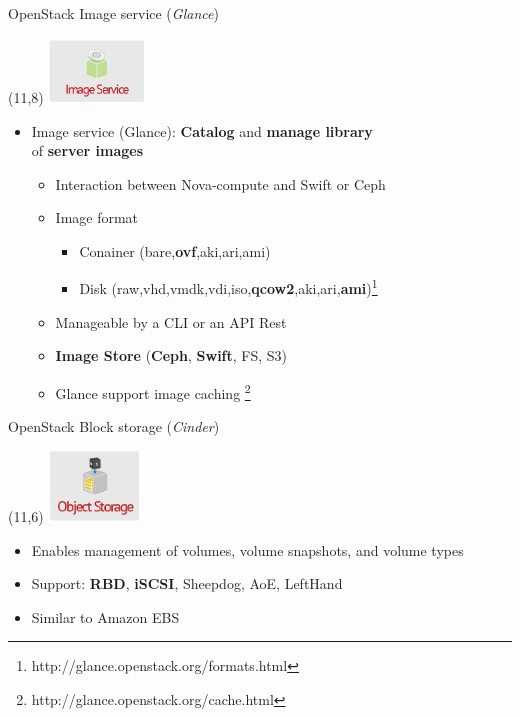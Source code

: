 \begin{frame}{OpenStack Image service (\textsl{Glance})}
  \begin{textblock}{}(11,8)
    \includegraphics[width=7em]{img/image}
  \end{textblock}
  \begin{itemize}
    \item Image service (Glance): \textbf{Catalog} and \textbf{manage library}\\
      of \textbf{server images}
      \medskip
    \begin{itemize}
      \item Interaction between Nova-compute and Swift or Ceph
        \medskip
        \item Image format
        \begin{itemize}
          \item Conainer (bare,\textbf{ovf},aki,ari,ami)
          \item Disk (raw,vhd,vmdk,vdi,iso,\textbf{qcow2},aki,ari,\textbf{ami})\footnote{http://glance.openstack.org/formats.html}
        \end{itemize}
        \medskip
      \item Manageable by a CLI or an API Rest
        \medskip
      \item \textbf{Image Store} (\textbf{Ceph}, \textbf{Swift}, FS, S3)
        \medskip
      \item Glance support image caching \footnote{http://glance.openstack.org/cache.html}
    \end{itemize}
  \end{itemize}
\end{frame}

\begin{frame}{OpenStack Block storage (\textsl{Cinder})}
  \begin{textblock}{}(11,6)
    \includegraphics[width=6.5em]{img/swift}
  \end{textblock}
  \begin{itemize}
    \item Enables management of volumes, volume snapshots, and volume types
        \medskip
    \item Support: \textbf{RBD}, \textbf{iSCSI}, Sheepdog, AoE, LeftHand
        \medskip
    \item Similar to Amazon EBS
  \end{itemize}
\end{frame}

